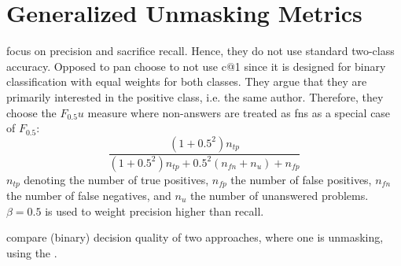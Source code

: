\section{Generalized Unmasking Metrics}
\label{sec:generalized_unmasking_metrics}

\citet{bevendorff_generalizing_2019} focus on precision and sacrifice recall.
Hence, they do not use standard two-class accuracy.
Opposed to \ac{pan} \citet{bevendorff_generalizing_2019} choose to not use c@1 since it is designed for 
binary classification with equal weights for both classes.
They argue that they are primarily interested in the positive class, i.e. the same author.
Therefore, they choose the $F_0.5u$ measure where non-answers are treated as \acp{fn} as a special case of $F_{0.5}$:
$$\frac{(1+0.5^2)n_{tp}}{(1+0.5^2)n_{tp}+0.5^2(n_{fn}+n_{u})+n_{fp}}$$
$n_{tp}$ denoting the number of true positives, $n_{fp}$ the number of false positives, 
$n_{fn}$ the number of false negatives, and $n_{u}$ the number of unanswered problems.
$\beta=0.5$ is used to weight precision higher than recall.


\citet{bevendorff_bias_2019} compare (binary) decision quality of two approaches, where one is unmasking, 
using the .